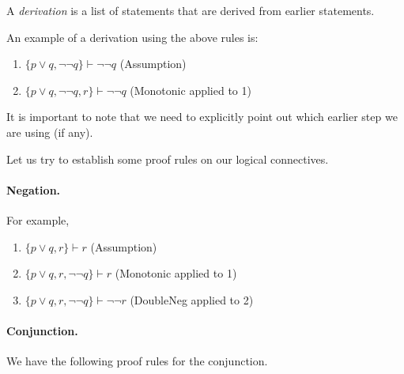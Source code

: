 \begin{definition}
A \textit{derivation} is a list of statements that are derived from earlier statements.
\end{definition}

An example of a derivation using the above rules is:
\begin{enumerate}
    \item $\{p\vee q,\neg\neg q\}\vdash\neg\neg q$ \hfill (\textsf{Assumption})
    \item $\{p\vee q, \neg\neg q, r\}\vdash\neg\neg q$ \hfill (\textsf{Monotonic} applied to 1)
\end{enumerate}
It is important to note that we need to explicitly point out which earlier step we are using (if any).

Let us try to establish some proof rules on our logical connectives.

\paragraph{Negation.}

\begin{prooftree}
\end{prooftree}

For example,
\begin{enumerate}
    \item $\{p\vee q,r\}\vdash r$ \hfill (\textsf{Assumption})
    \item $\{p\vee q, r, \neg\neg q\}\vdash r$ \hfill (\textsf{Monotonic} applied to 1)
    \item $\{p\vee q, r, \neg\neg q\}\vdash\neg\neg r$ \hfill (\textsf{DoubleNeg} applied to 2)
\end{enumerate}

\paragraph{Conjunction.}

We have the following proof rules for the conjunction.

\begin{prooftree}
\end{prooftree}

